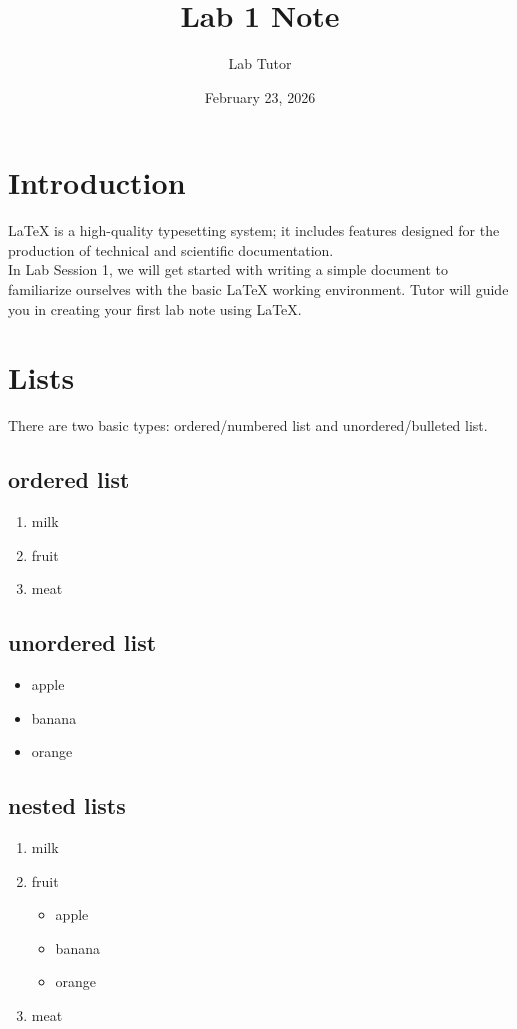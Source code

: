 \documentclass{article}
\title{Lab 1 Note}
\author{Lab Tutor}
\date{February 23, 2026 }
\begin{document}
\maketitle

\tableofcontents 


\section{Introduction}

\LaTeX{} is a high-quality typesetting system; it includes features designed for the production of technical and scientific documentation.\\

In Lab Session 1, we will get started with writing a simple document to familiarize ourselves with the basic \LaTeX{} working environment. Tutor will guide you in creating your first lab note using \LaTeX{}.



\section{Lists}
There are two basic types: ordered/numbered list and unordered/bulleted list.

\subsection{ordered list}
\begin{enumerate}
	\item milk
	\item fruit
	\item meat
\end{enumerate}

\subsection{unordered list}
\begin{itemize}
	\item apple
	\item banana
	\item orange
\end{itemize}



\subsection{nested lists}
\begin{enumerate}
	\item milk
	\item fruit
	\begin{itemize}
		\item apple
		\item banana
		\item orange
	\end{itemize}
	\item meat
\end{enumerate}
\end{document}
